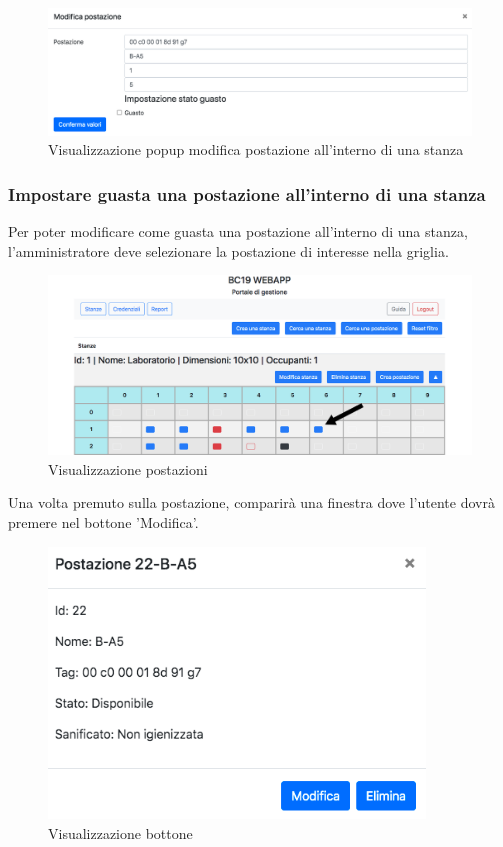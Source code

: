 \begin{figure}[H]
	\centering
	\includegraphics[width=15cm]{res/images/editWorkstation.png}
	\caption{Visualizzazione popup modifica postazione all'interno di una stanza}
\end{figure}

\subsubsection{Impostare guasta una postazione all'interno di una stanza}
Per poter modificare come guasta una postazione all'interno di una stanza, l'amministratore deve selezionare la postazione di interesse nella griglia.
\begin{figure}[H]
	\centering
	\includegraphics[width=15cm]{res/images/postDaEliminare.png}
	\caption{Visualizzazione postazioni}
\end{figure}
Una volta premuto sulla postazione, comparirà una finestra dove l'utente dovrà premere nel bottone 'Modifica'.
\begin{figure}[H]
	\centering
	\includegraphics[width=10cm]{res/images/bottoneCestinoWorkstation.png}
	\caption{Visualizzazione bottone}
\end{figure}
